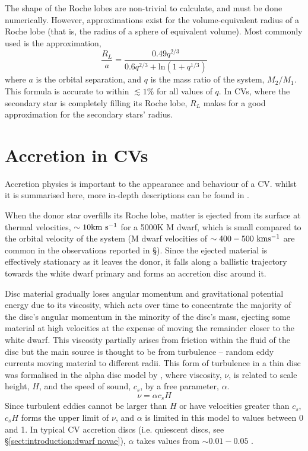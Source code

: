 The shape of the Roche lobes are non-trivial to calculate, and must be done numerically. However, approximations exist for the volume-equivalent radius of a Roche lobe (that is, the radius of a sphere of equivalent volume). Most commonly used is the \citet{Eggleton1983} approximation,
\begin{equation}
    \label{eqn:introduction:eggleton approximation}
    \frac{R_L}{a} = \frac{0.49 q^{2/3}}{0.6 q^{2/3} + \mathrm{ln}(1 + q^{1/3})}
\end{equation}
where $a$ is the orbital separation, and $q$ is the mass ratio of the system, $M_2 / M_1$. This formula is accurate to within $\lesssim 1\%$ for all values of $q$. In CVs, where the secondary star is completely filling its Roche lobe, $R_L$ makes for a good approximation for the secondary stars' radius.


\section{Accretion in CVs}
\label{sect:introduction:accretion}
Accretion physics is important to the appearance and behaviour of a CV. whilst it is summarised here, more in-depth descriptions can be found in \citet{warner1995, hellier2001, ritter2010}.

When the donor star overfills its Roche lobe, matter is ejected from its surface at thermal velocities, $\sim 10 \rm km\ s^{-1}$ for a 5000K M dwarf, which is small compared to the orbital velocity of the system (M dwarf velocities of $\sim 400-500 \rm\ km s^{-1}$ are common in the observations reported in \S{}). Since the ejected material is effectively stationary as it leaves the donor, it falls along a ballistic trajectory towards the white dwarf primary and forms an accretion disc around it. 

Disc material gradually loses angular momentum and gravitational potential energy due to its viscosity, which acts over time to concentrate the majority of the disc's angular momentum in the minority of the disc's mass, ejecting some material at high velocities at the expense of moving the remainder closer to the white dwarf. 
This viscosity partially arises from friction within the fluid of the disc but the main source is thought to be from turbulence -- random eddy currents moving material to different radii. 
This form of turbulence in a thin disc was formalised in the alpha disc model by \citet{shakura1973}, where viscosity, $\nu$, is related to scale height, $H$, and the speed of sound, $c_s$, by a free parameter, $\alpha$.
\begin{equation}
    \label{eqn:disc viscocity}
    \nu = \alpha c_s H
\end{equation}
Since turbulent eddies cannot be larger than $H$ or have velocities greater than $c_s$, $c_s H$ forms the upper limit of $\nu$, and $\alpha$ is limited in this model to values between 0 and 1. In typical CV accretion discs (i.e. quiescent discs, see \S\ref{sect:introduction:dwarf novae}), $\alpha$ takes values from $\sim 0.01 - 0.05$ \citep{hellier2001}.

